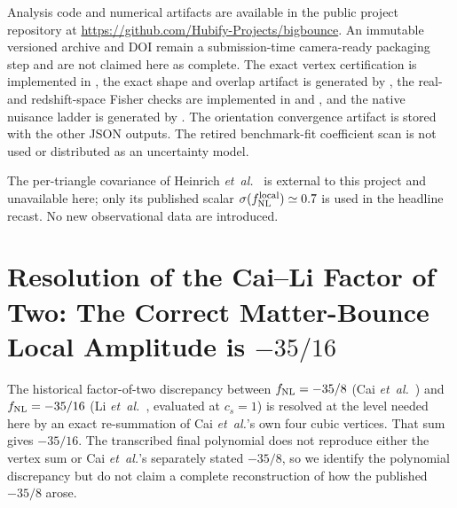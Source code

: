 \documentclass[aps,prd,twocolumn,superscriptaddress,showpacs,preprintnumbers,nofootinbib,longbibliography,floatfix]{revtex4-2}
\newcommand{\fnl}{f_{\rm NL}}
\newcommand{\etal}{\textit{et~al.}}
\begin{document}
Analysis code and numerical artifacts are available in the public project repository at \url{https://github.com/Hubify-Projects/bigbounce}. An immutable versioned archive and DOI remain a submission-time camera-ready packaging step and are not claimed here as complete. The exact vertex certification is implemented in , the exact shape and overlap artifact is generated by , the real- and redshift-space Fisher checks are implemented in  and , and the native nuisance ladder is generated by . The orientation convergence artifact is stored with the other JSON outputs. The retired benchmark-fit coefficient scan is not used or distributed as an uncertainty model.

The per-triangle covariance of Heinrich \etal~\cite{Heinrich:2023} is external to this project and unavailable here; only its published scalar $\sigma(\fnl^{\rm local})\simeq0.7$ is used in the headline recast. No new observational data are introduced.
\appendix

\section{Resolution of the Cai--Li Factor of Two: The Correct Matter-Bounce Local Amplitude is $-35/16$}
\label{app:convention}

The historical factor-of-two discrepancy between $\fnl = -35/8$ (Cai \textit{et~al.}~\cite{Cai:2009fn}) and $\fnl = -35/16$ (Li \etal~\cite{LiQuintin:2017}, evaluated at $c_s=1$) is resolved at the level needed here by an exact re-summation of Cai \etal's own four cubic vertices. That sum gives $-35/16$. The transcribed final polynomial does not reproduce either the vertex sum or Cai \etal's separately stated $-35/8$, so we identify the polynomial discrepancy but do not claim a complete reconstruction of how the published $-35/8$ arose.
\end{document}
